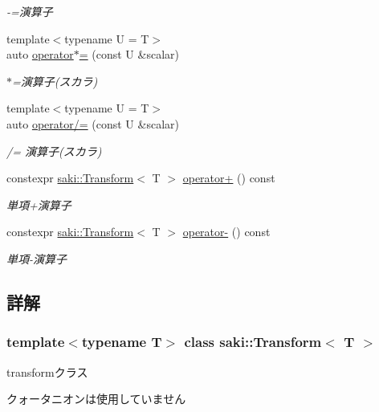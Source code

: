 \begin{DoxyCompactItemize}
\begin{DoxyCompactList}\small\item\em -\/=演算子 \end{DoxyCompactList}\item 
{\footnotesize template$<$typename U  = T$>$ }\\auto \mbox{\hyperlink{classsaki_1_1_transform_ab8df7cf8619c1f245d871e4e7627bf78}{operator$\ast$=}} (const U \&scalar)
\begin{DoxyCompactList}\small\item\em $\ast$=演算子(スカラ) \end{DoxyCompactList}\item 
{\footnotesize template$<$typename U  = T$>$ }\\auto \mbox{\hyperlink{classsaki_1_1_transform_a9a5559fdf626c8ecec063db74c6f4f8e}{operator/=}} (const U \&scalar)
\begin{DoxyCompactList}\small\item\em /= 演算子(スカラ) \end{DoxyCompactList}\item 
constexpr \mbox{\hyperlink{classsaki_1_1_transform}{saki\+::\+Transform}}$<$ T $>$ \mbox{\hyperlink{classsaki_1_1_transform_a3b35f6ee5bc410faf3025fa3d8c4abf0}{operator+}} () const
\begin{DoxyCompactList}\small\item\em 単項+演算子 \end{DoxyCompactList}\item 
constexpr \mbox{\hyperlink{classsaki_1_1_transform}{saki\+::\+Transform}}$<$ T $>$ \mbox{\hyperlink{classsaki_1_1_transform_a771da4173222f8200bfdfee101be1e28}{operator-\/}} () const
\begin{DoxyCompactList}\small\item\em 単項-\/演算子 \end{DoxyCompactList}\end{DoxyCompactItemize}


\subsection{詳解}
\subsubsection*{template$<$typename T$>$\newline
class saki\+::\+Transform$<$ T $>$}

transformクラス 

クォータニオンは使用していません 

